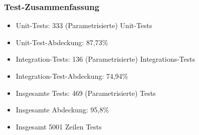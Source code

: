 \begin{frame}\frametitle{Test-Zusammenfassung}
    \begin{itemize}
        \item Unit-Tests: 333 (Parametrisierte) Unit-Tests
        \item Unit-Test-Abdeckung: 87,73\%
        \item Integration-Tests: 136 (Parametrisierte) Integrations-Tests
        \item Integration-Test-Abdeckung: 74,94\%
        \item Insgesamte Tests: 469 (Parametrisierte) Tests
        \item Insgesamte Abdeckung: 95,8\% 
        \item Insgesamt 5001 Zeilen Tests
    \end{itemize}
\end{frame}